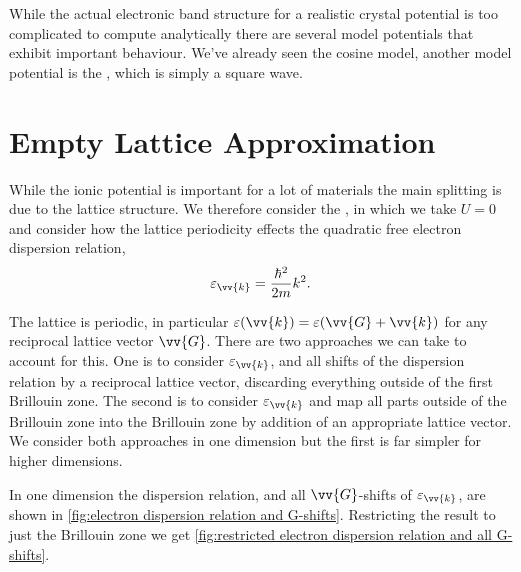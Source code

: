\documentclass[fleqn]{NotesClass}
\begin{document}
    While the actual electronic band structure for a realistic crystal potential is too complicated to compute analytically there are several model potentials that exhibit important behaviour.
    We've already seen the cosine model, another model potential is the , which is simply a square wave.
    
    \section{Empty Lattice Approximation}
    While the ionic potential is important for a lot of materials the main splitting is due to the lattice structure.
    We therefore consider the , in which we take \(U = 0\) and consider how the lattice periodicity effects the quadratic free electron dispersion relation,
    \begin{equation}
        \varepsilon_{\vv{k}} = \frac{\hbar^2}{2m}k^2.
    \end{equation}
    
    The lattice is periodic, in particular \(\varepsilon(\vv{k}) = \varepsilon(\vv{G} + \vv{k})\) for any reciprocal lattice vector \(\vv{G}\).
    There are two approaches we can take to account for this.
    One is to consider \(\varepsilon_{\vv{k}}\), and all shifts of the dispersion relation by a reciprocal lattice vector, discarding everything outside of the first Brillouin zone.
    The second is to consider \(\varepsilon_{\vv{k}}\) and map all parts outside of the Brillouin zone into the Brillouin zone by addition of an appropriate lattice vector.
    We consider both approaches in one dimension but the first is far simpler for higher dimensions.
    
    In one dimension the dispersion relation, and all \(\vv{G}\)-shifts of \(\varepsilon_{\vv{k}}\), are shown in \cref{fig:electron dispersion relation and G-shifts}.
    Restricting the result to just the Brillouin zone we get \cref{fig:restricted electron dispersion relation and all G-shifts}.
    
\end{document}
